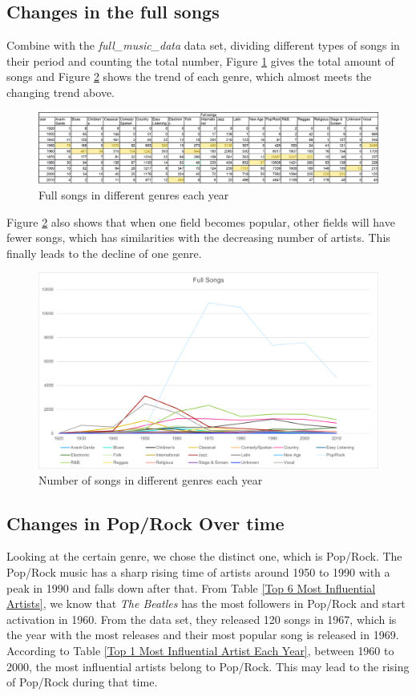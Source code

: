 \documentclass[12pt]{article}
\begin{document}
\subsection{Changes in the full songs}
Combine with the \emph{full\_music\_data} data set, dividing different types of songs in their period and counting the total number, Figure \ref{full table} gives the total amount of songs and Figure \ref{full songs} shows the trend of each genre, which almost meets the changing trend above. 
\begin{figure}[H]
\label{fig:aa}
\small
\centering
\includegraphics[width=12cm]{figures/Q3_Full_table.png}
\caption{Full songs in different genres each year}
\label{full table}
\end{figure}

Figure \ref{full songs} also shows that when one field becomes popular, other fields will have fewer songs, which has similarities with the decreasing number of artists. This finally leads to the decline of one genre. 
\begin{figure}[H]
\label{fig:aa}
\small
\centering
\includegraphics[width=12cm]{figures/Q3_Full_song.png}
\caption{Number of songs in different genres each year}
\label{full songs}
\end{figure}

\subsection{Changes in Pop/Rock Over time}
Looking at the certain genre, we chose the distinct one, which is Pop/Rock. The Pop/Rock music has a sharp rising time of artists around 1950 to 1990 with a peak in 1990 and falls down after that. From Table \ref{Top 6 Most Influential Artists}, we know that \emph{The Beatles} has the most followers in Pop/Rock and start activation in 1960. From the data set, they released 120 songs in 1967, which is the year with the most releases and their most popular song is released in 1969. According to Table \ref{Top 1 Most Influential Artist Each Year}, between 1960 to 2000, the most influential artists belong to Pop/Rock. This may lead to the rising of Pop/Rock during that time.
\end{document}
